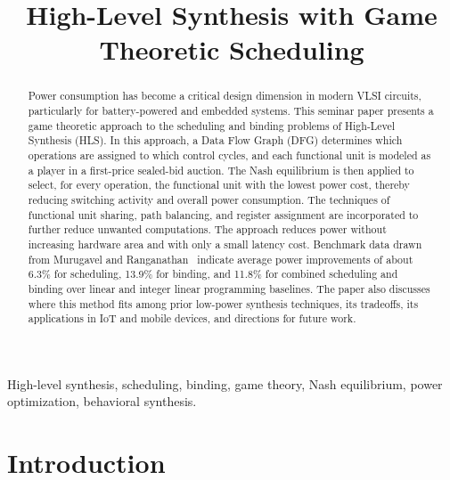 \documentclass[conference]{IEEEtran}
\begin{document}
\title{High-Level Synthesis with Game Theoretic Scheduling}

\author{
}

\maketitle

\begin{abstract}
Power consumption has become a critical design dimension in modern
VLSI circuits, particularly for battery-powered and embedded systems.
This seminar paper presents a game theoretic approach to the scheduling
and binding problems of High-Level Synthesis (HLS). In this approach,
a Data Flow Graph (DFG) determines which operations are assigned to
which control cycles, and each functional unit is modeled as a player
in a first-price sealed-bid auction. The Nash equilibrium is then
applied to select, for every operation, the functional unit with the
lowest power cost, thereby reducing switching activity and overall
power consumption. The techniques of functional unit sharing, path
balancing, and register assignment are incorporated to further reduce
unwanted computations. The approach reduces power without increasing
hardware area and with only a small latency cost. Benchmark data drawn
from Murugavel and Ranganathan~\cite{murugavel2003} indicate average
power improvements of about 6.3\% for scheduling, 13.9\% for binding,
and 11.8\% for combined scheduling and binding over linear and integer
linear programming baselines. The paper also discusses where this
method fits among prior low-power synthesis techniques, its tradeoffs,
its applications in IoT and mobile devices, and directions for future
work.
\end{abstract}

\begin{IEEEkeywords}
High-level synthesis, scheduling, binding, game theory, Nash
equilibrium, power optimization, behavioral synthesis.
\end{IEEEkeywords}

\section{Introduction}
\end{document}
